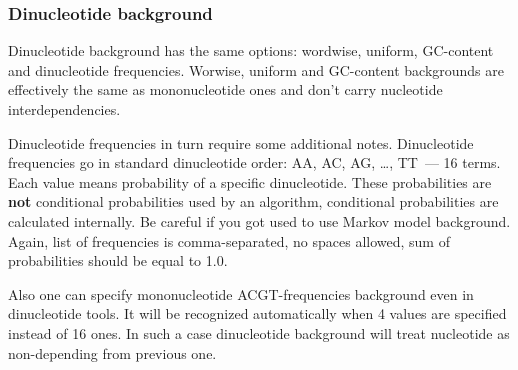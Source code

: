 \subsubsection{Dinucleotide background}
Dinucleotide background has the same options: wordwise, uniform, GC-content and dinucleotide frequencies. Worwise, uniform and GC-content backgrounds are effectively the same as mononucleotide ones and don't carry nucleotide interdependencies.

Dinucleotide frequencies in turn require some additional notes. Dinucleotide frequencies go in standard dinucleotide order: AA, AC, AG, \dots, TT~--- 16 terms. Each value means probability of a specific dinucleotide. These probabilities are \textbf{not} conditional probabilities used by an algorithm, conditional probabilities are calculated internally. Be careful if you got used to use Markov model background. Again, list of frequencies is comma-separated, no spaces allowed, sum of probabilities should be equal to 1.0.

Also one can specify mononucleotide ACGT-frequencies background even in dinucleotide tools. It will be recognized automatically when 4 values are specified instead of 16 ones. In such a case dinucleotide background will treat nucleotide as non-depending from previous one.
